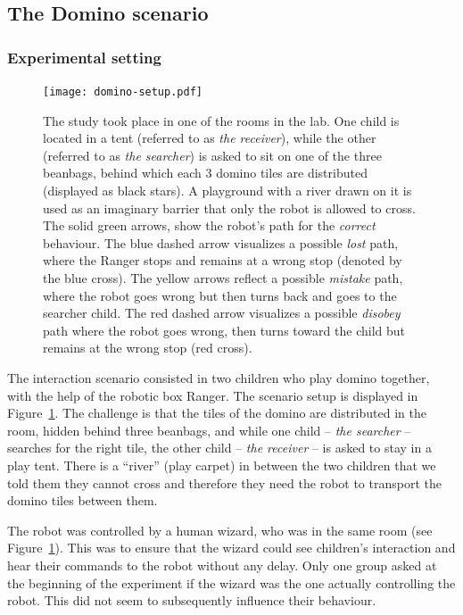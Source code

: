 \documentclass{sig-alternate}
\begin{document}
\subsection{The Domino scenario}

\subsubsection{Experimental setting}

\begin{figure}[ht!] 
    \centering 
    \texttt{[image: domino-setup.pdf]} 
    \caption{\small The study took place in one of the rooms in the lab. One
    child is located in a tent (referred to as \textit{the receiver}), while the
    other (referred to as \textit{the searcher}) is asked to sit on one of the
    three beanbags, behind which each 3 domino tiles are distributed (displayed
    as black stars). A playground with a river drawn on it is used as an
    imaginary barrier that only the robot is allowed to cross. The solid green
    arrows, show the robot's path for the \textit{correct} behaviour. The blue
    dashed arrow visualizes a possible \textit{lost} path, where the Ranger
    stops and remains at a wrong stop (denoted by the blue cross). The yellow
    arrows reflect a possible \textit{mistake} path, where the robot goes wrong
    but then turns back and goes to the searcher child. The red dashed arrow
    visualizes a possible \textit{disobey} path where the robot goes wrong, then
    turns toward the child but remains at the wrong stop (red cross).} 

    \label{fig:domino-setup} 
\end{figure}


The interaction scenario consisted in two children who play domino together,
with the help of the robotic box Ranger. The scenario setup is displayed in
Figure~\ref{fig:domino-setup}. The challenge is that the tiles of the domino are
distributed in the room, hidden behind three beanbags, and while one child --
\textit{the searcher} -- searches for the right tile, the other child --
\textit{the receiver} -- is asked to stay in a play tent. There is a ``river''
(play carpet) in between the two children that we told them they cannot cross
and therefore they need the robot to transport the domino tiles between them.

The robot was controlled by a human wizard, who was in the same room (see
Figure~\ref{fig:domino-setup}). This was to ensure that the wizard could see
children's interaction and hear their commands to the robot without any delay.
Only one group asked at the beginning of the experiment if the wizard was the
one actually controlling the robot. This did not seem to subsequently influence
their behaviour.
\end{document}
